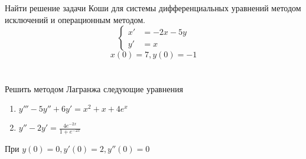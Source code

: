 \documentclass[a4paper,12pt]{article}
\begin{document}
	\section{}
	Найти решение задачи Коши для системы дифференциальных уравнений методом исключений и операционным методом.
	\begin{equation*}
	\begin{cases}
	x' &=-2x-5y \\
	y' &=x
	\end{cases}
	\end{equation*}
	\begin{equation*}
			x(0)=7, y(0) =-1
	\end{equation*}	
	
	\section{}
	Решить методом Лагранжа следующие уравнения
	\begin{enumerate}
		\item $y'''-5y''+6y'=x^2+x+4e^x$
		\item $y''-2y'=\frac{4e^{-2x}}{1+e^{-2x}}$
	\end{enumerate}

	При $y(0)=0, y'(0)=2, y''(0)=0$
	
	
\end{document}
